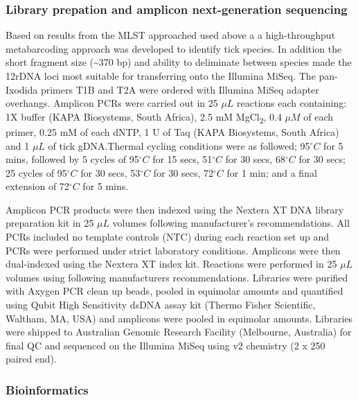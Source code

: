 \documentclass[a4paper, nobind]{templates/ociamthesis}
\begin{document}
\hypertarget{library-prepation-and-amplicon-next-generation-sequencing}{%
\subsubsection{Library prepation and amplicon next-generation sequencing}\label{library-prepation-and-amplicon-next-generation-sequencing}}

Based on results from the MLST approached used above a a high-throughput metabarcoding approach was developed to identify tick species.
In addition the short fragment size (\textasciitilde370 bp) and ability to deliminate between species made the 12rDNA loci most suitable for transferring onto the Illumina MiSeq.
The pan-Ixodida primers T1B and T2A \autocite{beatiAnalysisSystematicRelationships2001} were ordered with Illumina MiSeq adapter overhangs.
Amplicon PCRs were carried out in 25 \(\mu L\) reactions each containing: 1X buffer (KAPA Biosystems, South Africa), 2.5 mM MgCl\textsubscript{2}, 0.4 \(\mu M\) of each primer, 0.25 mM of each dNTP, 1 U of Taq (KAPA Biosystems, South Africa) and 1 \(\mu L\) of tick gDNA.Thermal cycling conditions were as followed; 95\(^\circ C\) for 5 mins, followed by 5 cycles of 95\(^\circ C\) for 15 secs, 51\(^\circ C\) for 30 secs, 68\(^\circ C\) for 30 secs; 25 cycles of 95\(^\circ C\) for 30 secs, 53\(^\circ C\) for 30 secs, 72\(^\circ C\) for 1 min; and a final extension of 72\(^\circ C\) for 5 mins.

Amplicon PCR products were then indexed using the Nextera XT DNA library preparation kit in 25 \(\mu L\) volumes following manufacturer's recommendations.
All PCRs included no template controls (NTC) during each reaction set up and PCRs were performed under strict laboratory conditions. Amplicons were then dual-indexed using the Nextera XT index kit.
Reactions were performed in 25 \(\mu L\) volumes using following manufacturers recommendations.
Libraries were purified with Axygen PCR clean up beads, pooled in equimolar amounts and quantified using Qubit High Sensitivity dsDNA assay kit (Thermo Fisher Scientific, Waltham, MA, USA) and amplicons were pooled in equimolar amounts.
Libraries were shipped to Australian Genomic Research Facility (Melbourne, Australia) for final QC and sequenced on the Illumina MiSeq using v2 chemistry (2 x 250 paired end).

\hypertarget{bioinformatics-1}{%
\subsubsection{Bioinformatics}\label{bioinformatics-1}}
\end{document}
